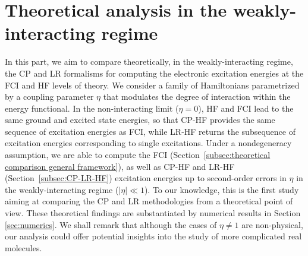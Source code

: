 \documentclass[11pt]{article}
\begin{document}
\section{Theoretical analysis in the weakly-interacting regime}
\label{sec:weakly_interacting}

\par In this part, we aim to compare theoretically, in the weakly-interacting regime, the CP and LR formalisms for computing the electronic excitation energies at the FCI and HF levels of theory. We consider a family of Hamiltonians parametrized by a coupling parameter $\eta$ that modulates the degree of interaction within the energy functional. In the non-interacting limit ($\eta=0$), HF and FCI lead to the same ground and excited state energies, so that CP-HF provides the same sequence of excitation energies as FCI, while LR-HF returns the subsequence of excitation energies corresponding to single excitations. Under a nondegeneracy assumption, we are able to compute the FCI (Section~\ref{subsec:theoretical comparison general framework}), as well as CP-HF and LR-HF (Section~\ref{subsec:CP-LR-HF}) excitation energies up to second-order errors in $\eta$ in the weakly-interacting regime ($|\eta| \ll 1$). To our knowledge, this is the first study aiming at comparing the CP and LR methodologies from a theoretical point of view. These theoretical findings are substantiated by numerical results in Section \ref{sec:numerics}.  We shall remark that although the cases of $\eta\ne1$ are non-physical, our analysis could offer potential insights into the study of more complicated real molecules.
\end{document}
